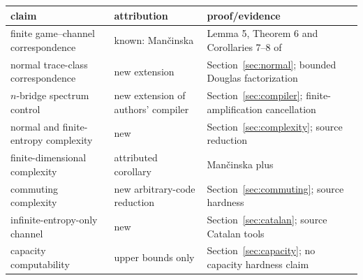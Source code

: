 \begin{center}\small
\begin{tabular}{@{}>{\raggedright\arraybackslash}p{.30\linewidth}>{\raggedright\arraybackslash}p{.24\linewidth}>{\raggedright\arraybackslash}p{.37\linewidth}@{}}\toprule
claim&attribution&proof/evidence\\\midrule
finite game--channel correspondence&known: Man\v{c}inska&Lemma 5, Theorem 6 and Corollaries 7--8 of \cite{Mancinska}\\
normal trace-class correspondence&new extension&Section~\ref{sec:normal}; bounded Douglas factorization\\
$n$-bridge spectrum control&new extension of authors' compiler&Section~\ref{sec:compiler}; finite-amplification cancellation\\
normal and finite-entropy complexity&new&Section~\ref{sec:complexity}; source reduction \cite{Sigma2}\\
finite-dimensional complexity&attributed corollary&Man\v{c}inska plus \cite{MIPRE}\\
commuting complexity&new arbitrary-code reduction&Section~\ref{sec:commuting}; source hardness \cite{Slofstra,MNY}\\
infinite-entropy-only channel&new&Section~\ref{sec:catalan}; source Catalan tools \cite{Entropy}\\
capacity computability&upper bounds only&Section~\ref{sec:capacity}; no capacity hardness claim\\\bottomrule
\end{tabular}
\end{center}
